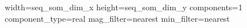 width={{seq_som_dim_x}}
height={{seq_som_dim_y}}
components=1
component_type=real
mag_filter=nearest
min_filter=nearest
